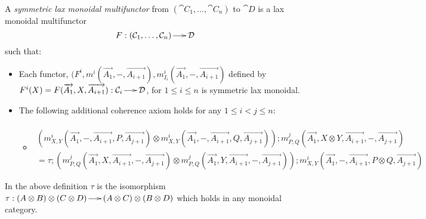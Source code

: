 \begin{definition}
  \label{def:lax-monoidal-multifunctors}
  A \emph{symmetric lax monoidal multifunctor} from $(\cat{C}_1,\ldots,\cat{C}_n)$ to $\cat{D}$ is a lax monoidal multifunctor
  \[F : (\mathcal{C}_1,\ldots,\mathcal{C}_n) \to \mathcal{D}\]
  such that:
  \begin{itemize}
  \item Each functor,
    $(F^i, m^i(\overrightarrow{A_1},-,\overrightarrow{A_{i+1}}), m^i_{I_i}(\overrightarrow{A_1},-,\overrightarrow{A_{i+1}})$
    defined by
    $F^i(X) = F(\overrightarrow{A_1},X,\overrightarrow{A_{i+1}}) : \mathcal{C}_i \to \mathcal{D}$,
    for $1 \leq i \leq n$ is symmetric lax monoidal.
  \item The following additional coherence axiom holds for any $1 \leq i < j \leq n$:
    \begin{itemize}
      \vspace{-10px}
    \item \begin{math}
      \begin{array}{lll}
        \\
        (m^i_{X,Y}(\overrightarrow{A_1},-,\overrightarrow{A_{i+1}},P,\overrightarrow{A_{j+1}}) \otimes m^i_{X,Y}(\overrightarrow{A_1},-,\overrightarrow{A_{i+1}},Q,\overrightarrow{A_{j+1}}));m^j_{P,Q}(\overrightarrow{A_1},X \otimes Y,\overrightarrow{A_{i+1}},-,\overrightarrow{A_{j+1}}) \\
        = \tau;(m^j_{P,Q}(\overrightarrow{A_1},X,\overrightarrow{A_{i+1}},-,\overrightarrow{A_{j+1}}) \otimes m^j_{P,Q}(\overrightarrow{A_1},Y,\overrightarrow{A_{i+1}},-,\overrightarrow{A_{j+1}}));m^{i}_{X,Y}(\overrightarrow{A_1},-,\overrightarrow{A_{i+1}},P \otimes Q,\overrightarrow{A_{j+1}})
      \end{array}
    \end{math}
    \end{itemize}
  \end{itemize}
\end{definition}
\noindent
In the above definition $\tau$ is the isomorphism
$\tau : (A \otimes B) \otimes (C \otimes D) \to (A \otimes C) \otimes (B \otimes D)$
which holds in any monoidal category.

